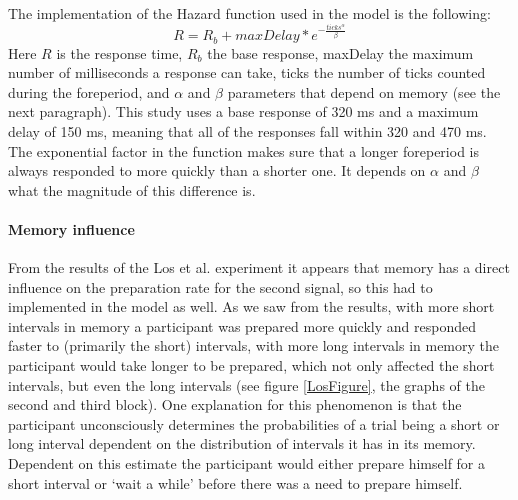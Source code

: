 \documentclass[10pt,letterpaper]{article}
\begin{document}
The implementation of the Hazard function used in the model is the following:
\begin{equation}
	R = R_b + maxDelay * e^{-\frac{ticks^\alpha}{\beta}}
\end{equation}
Here $R$ is the response time, $R_b$ the base response, maxDelay the maximum number of milliseconds a response can take, ticks the number of ticks counted during the foreperiod, and $\alpha$ and $\beta$ parameters that depend on memory (see the next paragraph). This study uses a base response of 320 ms and a maximum delay of 150 ms, meaning that all of the responses fall within 320 and 470 ms. The exponential factor in the function makes sure that a longer foreperiod is always responded to more quickly than a shorter one. It depends on $\alpha$ and $\beta$ what the magnitude of this difference is.

\paragraph{Memory influence}
From the results of the Los et al. experiment it appears that memory has a direct influence on the preparation rate for the second signal, so this had to implemented in the model as well. As we saw from the results, with more short intervals in memory a participant was prepared more quickly and responded faster to (primarily the short) intervals, with more long intervals in memory the participant would take longer to be prepared, which not only affected the short intervals, but even the long intervals (see figure \ref{LosFigure}, the graphs of the second and third block). One explanation for this phenomenon is that the participant unconsciously determines the probabilities of a trial being a short or long interval dependent on the distribution of intervals it has in its memory. Dependent on this estimate the participant would either prepare himself for a short interval or `wait a while' before there was a need to prepare himself. 
\end{document}
